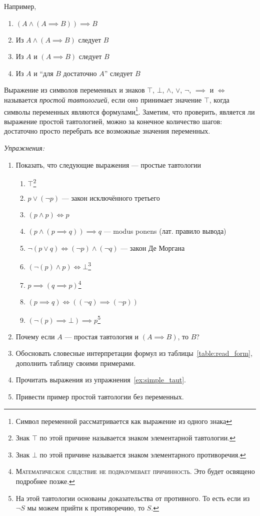 Например,
\begin{enumerate}
	\item{}$(A\land (A\implies B))\implies B$
	\item{}Из $A\land (A\implies B)$ следует $B$
	\item{}Из $A$ и $(A\implies B)$ следует $B$
	\item{}Из $A$ и ``для $B$ достаточно $A$'' следует $B$
\end{enumerate}

Выражение из символов переменных и знаков $\top$, $\bot$, $\land$, $\lor$, $\lnot$,
$\implies$ и $\iff$ называется {\it простой тавтологией}, если
оно принимает значение $\top$, когда символы переменных являются формулами\footnote{
	Символ переменной рассматривается как выражение из одного знака
}.
Заметим, что проверить, является ли выражение простой тавтологией,
можно за конечное количество шагов: достаточно просто перебрать все возможные значения
переменных.

\vspace{1em}
{\it Упражнения:}

\begin{enumerate}
	\item{}Показать, что следующие выражения --- простые тавтологии\label{ex:simple_taut}
	\begin{enumerate}
		\item{}$\top$\footnote{Знак $\top$ по этой причине называется
			знаком элементарной тавтологии.}
		\item{}$p\lor (\lnot p)$ --- закон исключённого третьего
		\item{}$(p\land p)\iff p$
		\item{}$(p\land (p\implies q))\implies q$ --- modus ponens (лат. правило вывода)
		\item{}$\lnot(p\lor q)\iff (\lnot p)\land (\lnot q)$ --- закон Де Моргана
		\item{}$(\lnot(p)\land p)\iff\bot$\footnote{
			Знак $\bot$ по этой причине называется
			знаком элементарного противоречия.}
		\item{}$p\implies (q\implies p)$\footnote{
			\textsc{Математическое следствие не подразумевает причинность.}
			Это будет освящено подробнее позже.
		}
		\item{}${(p\implies q)\iff ((\lnot q)\implies (\lnot p))}$
		\item{}$(\lnot(p)\implies\bot)\implies p$\footnote{На этой тавтологии основаны
			доказательства от противного. То есть если из $\lnot S$ мы можем прийти
			к противоречию, то $S$.}
	\end{enumerate}
	\item{}Почему если $A$ --- простая тавтология и $(A\implies B)$, то $B$?
	\item{}Обосновать словесные интерпретации формул из таблицы~\ref{table:read_form},
	дополнить таблицу своими примерами.
	\item{}Прочитать выражения из упражнения~\ref{ex:simple_taut}.
	\item{}Привести пример простой тавтологии без переменных.
\end{enumerate}

